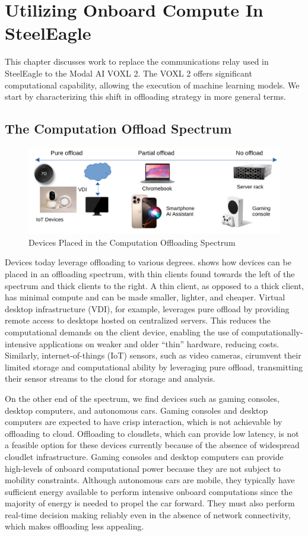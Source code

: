 \chapter{Utilizing Onboard Compute In SteelEagle}
\label{ch:voxl}

This chapter discusses work to replace the communications relay used in
SteelEagle to the Modal AI VOXL 2. The VOXL 2 offers significant computational
capability, allowing the execution of machine learning models.  We start by
characterizing this shift in offloading strategy in more general terms.

\section{The Computation Offload Spectrum}
\begin{figure}[htbp]
\centerline{\includegraphics[width = .8\textwidth]{figs/offload-spectrum-crop.pdf}}
\caption{Devices Placed in the Computation Offloading Spectrum}
\label{fig:offload-spectrum}
\end{figure}
Devices today leverage offloading to various degrees.
 shows how devices can be placed in an offloading
spectrum, with thin clients found towards the left of the spectrum and thick
clients to the right. A thin client, as opposed to a thick client, has minimal
compute and can be made smaller, lighter, and cheaper. Virtual desktop
infrastructure (VDI), for example, leverages pure offload by providing remote
access to desktops hosted on centralized servers.  This reduces the
computational demands on the client device, enabling the use of
computationally-intensive applications on weaker and older ``thin'' hardware,
reducing costs. Similarly, internet-of-things (IoT) sensors, such as video
cameras, cirumvent their limited storage and computational ability by
leveraging pure offload, transmitting their sensor streams to the cloud for
storage and analysis.

On the other end of the spectrum, we find devices such as gaming consoles,
desktop computers, and autonomous cars. Gaming consoles and desktop computers
are expected to have crisp interaction, which is not achievable by offloading
to cloud. Offloading to cloudlets, which can provide low latency, is not a
feasible option for these devices currently because of the absence of
widespread cloudlet infrastructure.  Gaming consoles and desktop computers can
provide high-levels of onboard computational power because they are not subject
to mobility constraints.  Although autonomous cars are mobile, they typically
have sufficient energy available to perform intensive onboard computations
since the majority of energy is needed to propel the car forward. They must
also perform real-time decision making reliably even in the absence of network
connectivity, which makes offloading less appealing.

